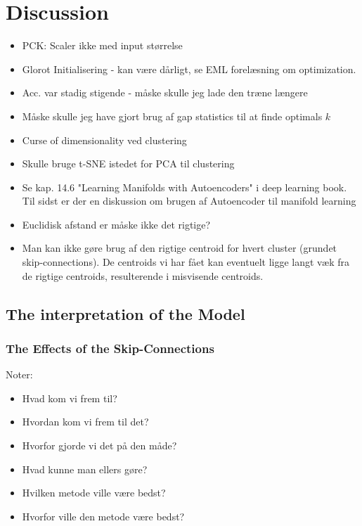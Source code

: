 \documentclass[./main.tex]{subfiles}
\begin{document}
\section{Discussion}\label{sec:discussion}
\begin{itemize}
    \item PCK: Scaler ikke med input størrelse
    \item Glorot Initialisering - kan være dårligt, se EML forelæsning om optimization.
    \item Acc. var stadig stigende - måske skulle jeg lade den træne længere
    \item Måske skulle jeg have gjort brug af gap statistics til at finde optimals $k$
    \item Curse of dimensionality ved clustering
    \item Skulle bruge t-SNE istedet for PCA til clustering
    \item Se kap. 14.6 "Learning Manifolds with Autoencoders" i deep learning book. Til sidst er der en diskussion om brugen af Autoencoder til manifold learning
    \item Euclidisk afstand er måske ikke det rigtige?
    \item Man kan ikke gøre brug af den rigtige centroid for hvert cluster (grundet skip-connections). De centroids vi har fået kan eventuelt ligge langt væk fra de rigtige centroids, resulterende i misvisende centroids.
\end{itemize}

\subsection{The interpretation of the Model}
\subsubsection{The Effects of the Skip-Connections}
Noter:
\begin{itemize}
    \item Hvad kom vi frem til?
    \item Hvordan kom vi frem til det?
    \item Hvorfor gjorde vi det på den måde?
    \item Hvad kunne man ellers gøre?
    \item Hvilken metode ville være bedst?
    \item Hvorfor ville den metode være bedst?
\end{itemize}
\end{document}
